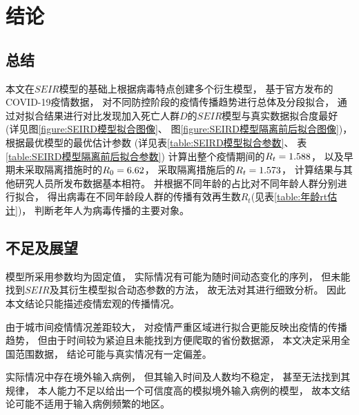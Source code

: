 \section{结论}
\subsection{总结}
\par 本文在$SEIR$模型的基础上根据病毒特点创建多个衍生模型，
基于官方发布的COVID-19疫情数据，
对不同防控阶段的疫情传播趋势进行总体及分段拟合，
通过对拟合结果进行对比发现加入死亡人群$D$的$SEIR$模型与真实数据拟合度最好
(详见图\ref{figure:SEIRD模型拟合图像}、
图\ref{figure:SEIRD模型隔离前后拟合图像})，
根据最优模型的最优估计参数
(详见表\ref{table:SEIRD模型拟合参数}、
表\ref{table:SEIRD模型隔离前后拟合参数})
计算出整个疫情期间的$R_t=1.588$，
以及早期未采取隔离措施时的$R_0=6.62$，
采取隔离措施后的$R_t=1.573$，
计算结果与其他研究人员所发布数据基本相符。
并根据不同年龄的占比对不同年龄人群分别进行拟合，
得出病毒在不同年龄段人群的传播有效再生数$R_t$(见表\ref{table:年龄rt估计})，
判断老年人为病毒传播的主要对象。
\subsection{不足及展望}
\par 模型所采用参数均为固定值，
实际情况有可能为随时间动态变化的序列，
但未能找到$SEIR$及其衍生模型拟合动态参数的方法，
故无法对其进行细致分析。
因此本文结论只能描述疫情宏观的传播情况。
\par 由于城市间疫情情况差距较大，
对疫情严重区域进行拟合更能反映出疫情的传播趋势，
但由于时间较为紧迫且未能找到方便爬取的省份数据源，
本文决定采用全国范围数据，
结论可能与真实情况有一定偏差。
\par 实际情况中存在境外输入病例，
但其输入时间及人数均不稳定，
甚至无法找到其规律，
本人能力不足以给出一个可信度高的模拟境外输入病例的模型，
故本文结论可能不适用于输入病例频繁的地区。